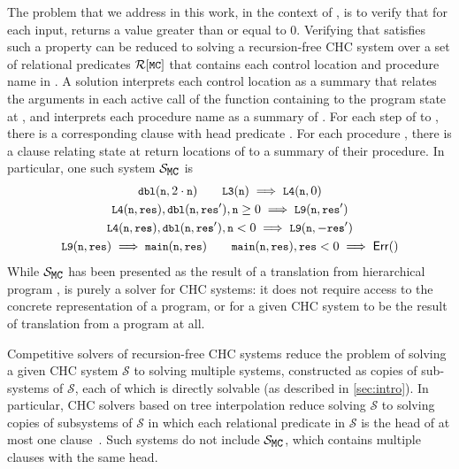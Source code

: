 The problem that we address in this work, in the context of
, is to verify that for each input, 
returns a value greater than or equal to $0$.
Verifying that  satisfies such a property can be reduced
to solving a recursion-free CHC system over a set of relational
predicates $\mcpreds$ that contains each control location and
procedure name in .
%
A solution interprets each control location  as a summary that
relates the arguments in each active call of the function containing
 to the program state at , and interprets each procedure
name  as a summary of .
%
For each step of  to , there is a corresponding
clause with head predicate .
%
For each procedure , there is a clause relating state at return
locations of  to a summary of their procedure.
%
In particular, one such system $\mcchc$ is
%
\begin{gather}
  \cc{dbl}(\cc{n}, 2 \cdot \cc{n}) \qquad
  \cc{L3}(\cc{n}) \implies 
  \cc{L4}(\cc{n}, 0) \notag \\
  \cc{L4}(\cc{n}, \cc{res}), \cc{dbl}(\cc{n}, \cc{res}'), %
  \cc{n} \geq 0 \implies %
  \cc{L9}(\cc{n}, \cc{res}') \label{eqn:then} \\
  \cc{L4}(\cc{n}, \cc{res}), \cc{dbl}(\cc{n}, \cc{res}'), %
  \cc{n} < 0 \implies %
  \cc{L9}(\cc{n}, -\cc{res}') \label{eqn:else} \\
  \cc{L9}(\cc{n}, \cc{res}) \implies %
  \cc{main}(\cc{n}, \cc{res}) \qquad
  \cc{main}(\cc{n}, \cc{res}), \cc{res} < 0 \implies \mathsf{Err}()
  \notag
\end{gather}
%
While $\mcchc$ has been presented as the result
of a translation from hierarchical program , \sys is
purely a solver for CHC systems: it does not require access to the
concrete representation of a program, or for a given CHC system to be
the result of translation from a program at all.

Competitive solvers of recursion-free CHC systems reduce the problem
of solving a given CHC system $\mathcal{S}$ to solving multiple
systems, constructed as copies of sub-systems of $\mathcal{S}$, each
of which is directly solvable (as described in \autoref{sec:intro}).
%
In particular, CHC solvers based on tree interpolation reduce solving
$\mathcal{S}$ to solving copies of subsystems of $\mathcal{S}$ in
which each relational predicate in $\mathcal{S}$ is the head of at
most one clause~\cite{bjorner13,heizmann10}.
%
Such systems do not include $\mcchc$, which contains multiple clauses
with the same head.

